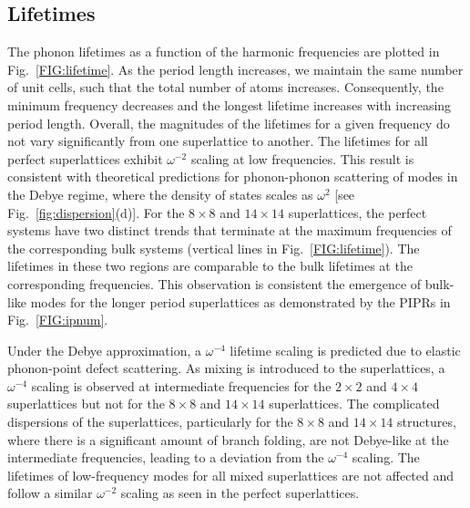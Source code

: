 \documentclass[aps,prb,preprint,preprintnumbers,amsmath,amssymb,floatfix,superscriptaddress]{revtex4}
\begin{document}
\subsection{Lifetimes}

The phonon lifetimes as a function of the harmonic frequencies are plotted in Fig.~\ref{FIG:lifetime}. As the period length increases, we maintain the same number of unit cells, such that the total number of atoms increases. Consequently, the minimum frequency decreases and the longest lifetime increases with increasing period length. Overall, the magnitudes of the lifetimes for a given frequency do not vary significantly from one superlattice to another. The lifetimes for all perfect superlattices exhibit $\omega^{-2}$ scaling at low frequencies. This result is consistent with theoretical predictions for phonon-phonon scattering of modes in the Debye regime, where the density of states scales as $\omega^{2}$ [see Fig.~\ref{fig:dispersion}(d)].\cite{Klemens_Thermal_1951} For the $8\times8$ and $14\times14$ superlattices, the perfect systems have two distinct trends that terminate at the maximum frequencies of the corresponding bulk systems (vertical lines in Fig.~\ref{FIG:lifetime}). The lifetimes in these two regions are comparable to the bulk lifetimes at the corresponding frequencies. This observation is consistent the emergence of bulk-like modes for the longer period superlattices as demonstrated by the PIPRs in Fig.~\ref{FIG:ipnum}.

Under the Debye approximation, a $\omega^{-4}$ lifetime scaling is predicted due to elastic phonon-point defect scattering.\cite{PhysRev.140.A1812,klemens_scattering_1955-3, klemens_thermal_1957-2} As mixing is introduced to the superlattices, a $\omega^{-4}$ scaling is observed at intermediate frequencies for the $2\times2$ and $4\times4$ superlattices but not for the $8\times8$ and $14\times14$ superlattices. The complicated dispersions of the superlattices, particularly for the $8\times8$ and $14\times14$ structures, where there is a significant amount of branch folding, are not Debye-like at the intermediate frequencies, leading to a deviation from the $\omega^{-4}$ scaling. The lifetimes of low-frequency modes for all mixed superlattices are not affected and follow a similar $\omega^{-2}$ scaling as seen in the perfect superlattices.
\end{document}
